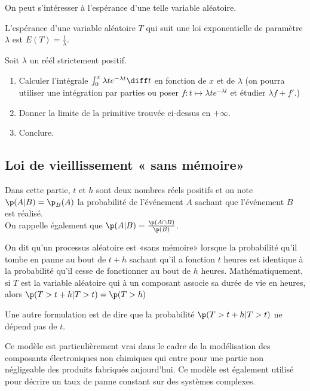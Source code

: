 \documentclass[11pt,a4paper,french]{article}
\begin{document}
On peut s'intéresser à l'espérance d'une telle variable aléatoire.

\begin{propriete}
  L'espérance d'une variable aléatoire $T$ qui suit une loi
  exponentielle de paramètre $\lambda$ est $E(T) = \frac1{\lambda}$.
\end{propriete}

\begin{exercice}
  Soit $\lambda$ un réél strictement positif.
  \begin{enumerate}
    \item Calculer l'intégrale $\int_0^x \lambda te^{-\lambda t} \diff
      t$ en fonction de $x$ et de $\lambda$ (on pourra utiliser une
        intégration par parties ou poser $f:t\mapsto \lambda
        te^{-\lambda t}$ et étudier $\lambda f + f'$.)
    \item Donner la limite de la primitive trouvée ci-dessus en
      $+\infty$.
    \item Conclure.
  \end{enumerate}
\end{exercice}

\subsection{Loi de vieillissement « sans mémoire»}

Dans cette partie, $t$ et $h$ sont deux nombres réels positifs et on
note $\p(A | B) = \p_B(A)$ la probabilité de l'événement $A$ sachant que
l'événement $B$ est réalisé.\\
On rappelle également que $\p(A | B) = \frac{\p(A\cap B)}{\p(B)}$.

\begin{definition}
  On dit qu'un processus aléatoire est «sans mémoire» lorsque la
  probabilité qu'il tombe en panne au bout de $t+h$ sachant qu'il a
  fonction $t$ heures est identique à la probabilité qu'il cesse de
  fonctionner au bout de $h$ heures. Mathématiquement, si $T$ est la
  variable aléatoire qui à un composant associe sa durée de vie en
  heures, alors $\p(T > t+h | T > t) = \p(T > h)$
\end{definition}

Une autre formulation est de dire que la probabilité $\p(T > t+h | T >
t)$ ne dépend pas de $t$.

Ce modèle est particulièrement vrai dans le cadre de la modélisation des
composants électroniques non chimiques qui entre pour une partie non
négligeable des produits fabriqués aujourd'hui. Ce modèle est également
utilisé pour décrire un taux de panne constant sur des systèmes
complexes.
\end{document}
